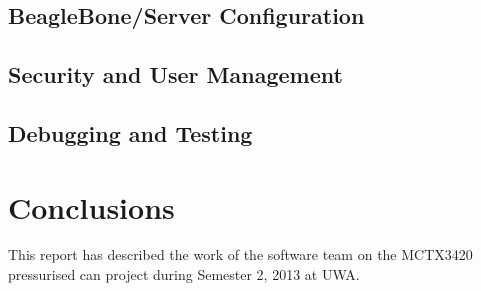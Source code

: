 \subsection{BeagleBone/Server Configuration}

\subsection{Security and User Management}



\subsection{Debugging and Testing}



\section{Conclusions}

This report has described the work of the software team on the MCTX3420 pressurised can project during Semester 2, 2013 at UWA.



